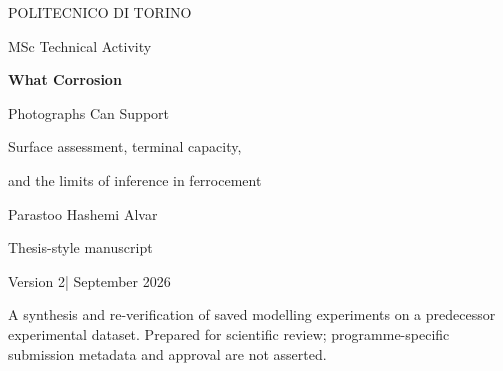 \documentclass[11pt,a4paper,oneside]{report}
\newcommand{\shared}{../..}
\newcommand{\draftversion}{Version 2}
\begin{document}
\hypersetup{pageanchor=false}
\begin{titlepage}
\centering
{\large POLITECNICO DI TORINO\par}\vspace{24mm}
{\large MSc Technical Activity\par}\vspace{8mm}
{\Huge\bfseries What Corrosion\par Photographs Can Support\par}\vspace{9mm}
{\Large Surface assessment, terminal capacity,\par and the limits of inference in ferrocement\par}\vspace{21mm}
{\Large Parastoo Hashemi Alvar\par}\vfill
{\large Thesis-style manuscript\par}\vspace{3mm}
{\draftversion\quad | September 2026\par}\vspace{8mm}
\begin{minipage}{.8\textwidth}\small\centering
A synthesis and re-verification of saved modelling experiments on a predecessor experimental dataset. Prepared for scientific review; programme-specific submission metadata and approval are not asserted.
\end{minipage}
\end{titlepage}
\hypersetup{pageanchor=true}

{\small\setlength{\parskip}{0pt}\tableofcontents}
\clearpage
\listoffigures
\clearpage
\listoftables
\clearpage{}










\appendix



\end{document}
